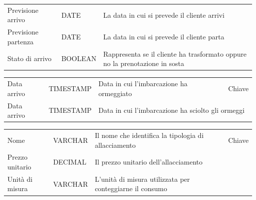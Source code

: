 \begin{center}
    \begin{tabularx}{\textwidth}{|l|l|X|}
        \hline
        \rowcolor{gray!30}
        \multicolumn{3}{|c|}{\textbf{Prenotazione}}\\
        \hline
        Previsione arrivo & DATE & La data in cui si prevede il cliente arrivi\\
        \hline
        Previsione partenza & DATE & La data in cui si prevede il cliente parta\\
        \hline
        Stato di arrivo & BOOLEAN & Rappresenta se il cliente ha trasformato oppure no la prenotazione in sosta\\
        \hline
    \end{tabularx}
\end{center}

\begin{center}
    \begin{tabularx}{\textwidth}{|l|l|l|X|}
        \hline
        \rowcolor{gray!30}
        \multicolumn{4}{|c|}{\textbf{Sosta}}\\
        \hline
        Data arrivo & TIMESTAMP & Data in cui l'imbarcazione ha ormeggiato & Chiave \\
        \hline
        Data arrivo & TIMESTAMP & \multicolumn{2}{l|}{Data in cui l'imbarcazione ha sciolto gli ormeggi} \\
        \hline
    \end{tabularx}
\end{center}

\begin{center}
    \begin{tabularx}{\textwidth}{|l|l|l|X|}
        \hline
        \rowcolor{gray!30}
        \multicolumn{4}{|c|}{\textbf{Allacciamento}}\\
        \hline
        Nome & VARCHAR & Il nome che identifica la tipologia di allacciamento &Chiave\\
        \hline
        Prezzo unitario & DECIMAL & Il prezzo unitario dell'allacciamento\\
        \hline
        Unità di misura & VARCHAR & L'unità di misura utilizzata per conteggiarne il consumo\\
        \hline
    \end{tabularx}
\end{center}

